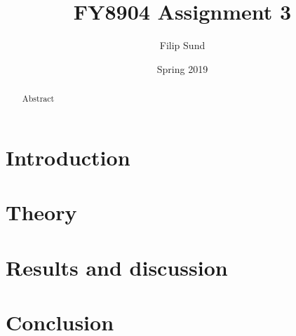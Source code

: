 \documentclass[a4paper]{article}
\title{FY8904 Assignment 3}
\date{Spring 2019}
\author{Filip Sund}
\begin{document}
\maketitle

\begin{abstract}
    Abstract
\end{abstract}

\section*{Introduction}


\cite{powell1970hybrid}

\section*{Theory}


\section*{Results and discussion}


\section*{Conclusion}

\printbibliography[title=References]
\end{document}
